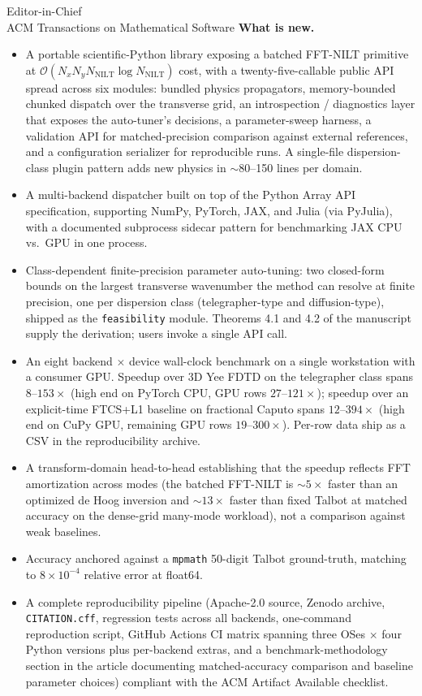 \documentclass[11pt]{letter}
\begin{document}
\begin{letter}{Editor-in-Chief \\ ACM Transactions on Mathematical Software}
\medskip\noindent\textbf{What is new.}
\begin{itemize}\setlength{\itemsep}{2pt}
\item A portable scientific-Python library exposing a batched FFT-NILT primitive at $\mathcal{O}(N_x N_y N_{\mathrm{NILT}}\log N_{\mathrm{NILT}})$ cost, with a twenty-five-callable public API spread across six modules: bundled physics propagators, memory-bounded chunked dispatch over the transverse grid, an introspection / diagnostics layer that exposes the auto-tuner's decisions, a parameter-sweep harness, a validation API for matched-precision comparison against external references, and a configuration serializer for reproducible runs. A single-file dispersion-class plugin pattern adds new physics in $\sim$80--150 lines per domain.
\item A multi-backend dispatcher built on top of the Python Array API specification, supporting NumPy, PyTorch, JAX, and Julia (via PyJulia), with a documented subprocess sidecar pattern for benchmarking JAX CPU vs.\ GPU in one process.
\item Class-dependent finite-precision parameter auto-tuning: two closed-form bounds on the largest transverse wavenumber the method can resolve at finite precision, one per dispersion class (telegrapher-type and diffusion-type), shipped as the \texttt{feasibility} module. Theorems 4.1 and 4.2 of the manuscript supply the derivation; users invoke a single API call.
\item An eight backend $\times$ device wall-clock benchmark on a single workstation with a consumer GPU. Speedup over 3D Yee FDTD on the telegrapher class spans $8$--$153\times$ (high end on PyTorch CPU, GPU rows $27$--$121\times$); speedup over an explicit-time FTCS+L1 baseline on fractional Caputo spans $12$--$394\times$ (high end on CuPy GPU, remaining GPU rows $19$--$300\times$). Per-row data ship as a CSV in the reproducibility archive.
\item A transform-domain head-to-head establishing that the speedup reflects FFT amortization across modes (the batched FFT-NILT is $\sim 5\times$ faster than an optimized de Hoog inversion and $\sim 13\times$ faster than fixed Talbot at matched accuracy on the dense-grid many-mode workload), not a comparison against weak baselines.
\item Accuracy anchored against a \texttt{mpmath} 50-digit Talbot ground-truth, matching to $8 \times 10^{-4}$ relative error at float64.
\item A complete reproducibility pipeline (Apache-2.0 source, Zenodo archive, \texttt{CITATION.cff}, regression tests across all backends, one-command reproduction script, GitHub Actions CI matrix spanning three OSes $\times$ four Python versions plus per-backend extras, and a benchmark-methodology section in the article documenting matched-accuracy comparison and baseline parameter choices) compliant with the ACM Artifact Available checklist.
\end{itemize}


\end{letter}
\end{document}
